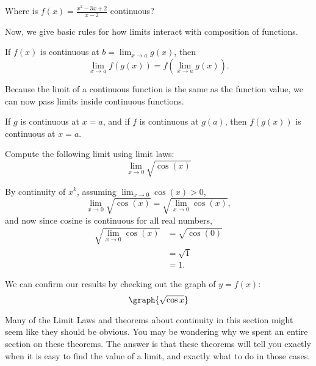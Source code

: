 \documentclass{ximera}
\begin{document}
\begin{question}
  Where is $f(x) = \frac{x^2-3x+2}{x-2}$ continuous?
  \begin{multipleChoice}
  \end{multipleChoice}
\end{question}


Now, we give basic rules for how limits interact with composition
of functions.

\begin{theorem}
  If $f(x)$ is continuous at $b = \lim_{x\to a} g(x)$, then
  \[
  \lim_{x\to a} f(g(x)) = f(\lim_{x\to a} g(x)).
  \]
\end{theorem}

Because the limit of a continuous function is the same as the function
value, we can now pass limits inside continuous functions.

\begin{corollary}

If $g$ is continuous at $x=a$, and if $f $ is continuous at $g(a)$,  then $f(g(x))$ is continuous at $x=a$.



\end{corollary}

\begin{example}
  Compute the following limit using limit laws:
  \[
  \lim_{x \to 0} \sqrt{\cos(x)}
  \]
  \begin{explanation}
    By continuity of $x^k$, assuming $\lim_{x \to 0} \cos(x) >0$,
    \[
    \lim_{x \to 0} \sqrt{\cos(x)} = \sqrt{\lim_{x \to 0} \cos(x)},
    \]
    and now since cosine is continuous for all real numbers,
    \begin{align*}
    \sqrt{\lim_{x \to 0} \cos(x)} & =\sqrt{\cos(0)}\\
    &= \sqrt{1}\\
    &= 1.
    \end{align*}
  \begin{onlineOnly}
    We can confirm our results by checking out the graph of $y=f(x)$:
    \[
    \graph{\sqrt{\cos{x}}}
    \]
  \end{onlineOnly}
  \end{explanation}
\end{example}

Many of the Limit Laws and theorems about continuity in this section
might seem like they should be obvious.  You may be wondering why we
spent an entire section on these theorems.  The answer is that these
theorems will tell you exactly when it is easy to find the value of a
limit, and exactly what to do in those cases.
\end{document}

